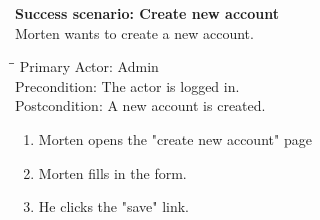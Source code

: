 \textbf{Success scenario: Create new account} \\
Morten wants to create a new account.
\begin{tabbing}
\hspace{5mm}\=\hspace{26mm}\=\kill
\>Primary Actor:\> Admin\\
\>Precondition:\> The actor is logged in.\\
\>Postcondition:\> A new account is created.
\end{tabbing}
\begin{enumerate} \setlength{\itemsep}{-1mm}
	\item Morten opens the "create new account" page
	\item Morten fills in the form.
	\item He clicks the "save" link.
\end{enumerate}